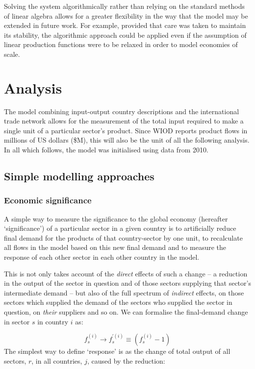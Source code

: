 \documentclass[a4paper]{article}
\begin{document}
Solving the system algorithmically rather than relying on the standard methods of linear algebra allows for a greater flexibility in the way that the model may be extended in future work. For example, provided that care was taken to maintain its stability, the algorithmic approach could be applied even if the assumption of linear production functions were to be relaxed in order to model economies of scale.


\section{Analysis}\label{sec:analysis}
The model combining input-output country descriptions and the international trade network allows for the measurement of the total input required to make a single unit of a particular sector's product.
Since WIOD reports product flows in millions of US dollars (\$M), this will also be the unit of all the following analysis.
In all which follows, the model was initialised using data from 2010.

\subsection{Simple modelling approaches}
\label{sec:simple_modelling_approaches}

\subsubsection*{Economic significance}
A simple way to measure the significance to the global economy (hereafter `significance') of a particular sector in a given country is to artificially reduce final demand for the products of that country-sector by one unit, to recalculate all flows in the model based on this new final demand and to measure the response of each other sector in each other country in the model.

This is not only takes account of the \textit{direct} effects of such a change -- a reduction in the output of the sector in question and of those sectors supplying that sector's intermediate demand -- but also of the full spectrum of \textit{indirect} effects, on those sectors which supplied the demand of the sectors who supplied the sector in question, on \textit{their} suppliers and so on.
We can formalise the final-demand change in sector $s$ in country $i$ as:

\begin{equation}\label{eqn:reduce_fd_by_one}
    f_s^{(i)} \rightarrow f_s^{\prime (i)} \equiv (f_s^{(i)} - 1)
\end{equation}
The simplest way to define `response' is as the change of total output of all sectors, $r$, in all countries, $j$, caused by the reduction:
\end{document}

